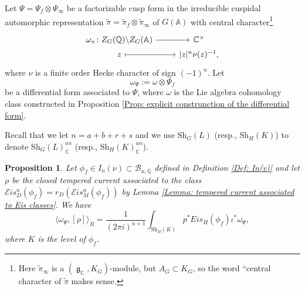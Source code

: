 \documentclass[11pt, a4paper]{amsart}
\theoremstyle{plain}
\newtheorem{proposition}[theorem]{Proposition}
\theoremstyle{definition}
\numberwithin{equation}{section}
\def\AAA{\mathbb{A}}
\def\CC{\mathbb{C}}
\def\QQ{\mathbb{Q}}
\DeclareMathOperator{\lieg}{\mathfrak g}
\newcommand{\Sh}{\mathrm{Sh}}
\begin{document}
Let $\Psi = \Psi_{f} \otimes \Psi_{\infty}$ be a factorizable cusp form in the irreducible cuspidal automorphic representation $\tilde{\pi} = \tilde{\pi}_f \otimes \tilde{\pi}_{\infty}$ of $G(\AAA)$ with central character\footnote{Here $\tilde{\pi}_{\infty}$ is a $(\lieg_{\CC}, K_G)$-module, but $A_{G} \subset K_{G}$, so the word ``central character of $\tilde{\pi}$ makes sense.}
\[
    \begin{tikzcd}[row sep = 0]
       \omega_{\pi} \colon Z_{G}(\QQ) \backslash Z_{G}(\AAA) \ar[r] & \CC^{\times} \\
                      z \ar[r, mapsto] & {|z|^{n} \nu(z)^{-1}}, 
    \end{tikzcd}
\]
where $\nu$ is a finite order Hecke character of sign $(-1)^{n}$. Let 
\begin{equation*}
    \omega_{\Psi} := \omega \otimes \Psi_{f}
\end{equation*}
be a differential form associated to $\Psi$, where $\omega$ is the Lie algebra cohomology class constructed in Proposition \ref{Prop: explicit construnction of the differential form}. 

Recall that we let $n = a + b + r + s$ and we use $\Sh_{G}(L)$ (resp., $\Sh_{H}(K)$) to denote $\Sh_{G}(L)_{\CC}^{an}$ (resp., $\Sh_{H}(K)_{\CC}^{an}$). 
\begin{proposition}
\label{Prop: pairing to integration of diff form}
 Let $\phi_f \in I_{n}(\nu) \subset \mathcal{B}_{n, \overline{\QQ}}$ defined in Definition \ref{Def: In(v)} and let $\rho$ be the closed tempered current associated to the class $\mathcal{E}is_{D}^{n}(\phi_f) = r_{D}(\mathcal{E}is_{M}^{n}(\phi_f))$ by Lemma \ref{Lemma: tempered current associated to Eis classes}. We have 
 \begin{equation*}
      \langle \omega_{\Psi}, [\rho] \rangle_{B} = \frac{1}{(2\pi i)^{n + 1}} \int_{\Sh_H(K)} p^{*} Eis_{H}(\phi_f) \iota^{*} \omega_{\Psi},
 \end{equation*}
 where $K$ is the level of $\phi_f$. 
    
\end{proposition}
\end{document}
